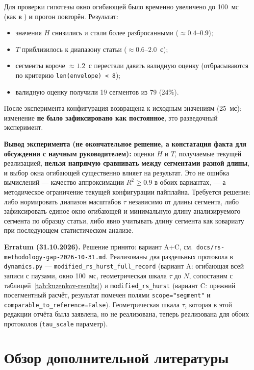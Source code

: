 \documentclass[12pt,a4paper]{article}
\begin{document}
Для проверки гипотезы окно огибающей было временно увеличено до 100~мс (как
в \cite{kuzenkov2014}) и прогон повторён. Результат:

\begin{itemize}
  \item значения $H$ снизились и стали более разбросанными ($\approx 0.4$--$0.9$);
  \item $T$ приблизилось к диапазону статьи ($\approx 0.6$--$2.0$~с);
  \item сегменты короче $\approx 1.2$~с перестали давать валидную оценку
   (отбрасываются по критерию \texttt{len(envelope) < 8});
  \item валидную оценку получили 19 сегментов из 79 (24\%).
\end{itemize}

После эксперимента конфигурация возвращена к исходным значениям (25~мс);
изменение \textbf{не было зафиксировано как постоянное}, это разведочный
эксперимент.

\textbf{Вывод эксперимента (не окончательное решение, а констатация факта
для обсуждения с научным руководителем):} оценки $H$ и $T$, получаемые
текущей реализацией, \textbf{нельзя напрямую сравнивать между сегментами
разной длины}, и выбор окна огибающей существенно влияет на результат. Это
не ошибка вычислений — качество аппроксимации $R^2 \geq 0.9$ в обоих
вариантах, — а методическое ограничение текущей конфигурации пайплайна.
Требуется решение: либо нормировать диапазон масштабов $\tau$ независимо от
длины сегмента, либо зафиксировать единое окно огибающей и минимальную
длину анализируемого сегмента по образцу статьи, либо явно учитывать длину
сегмента как ковариату при последующем статистическом анализе.

\textbf{Erratum (31.10.2026).} Решение принято: вариант A+C, см.\
\texttt{docs/rs-methodology-gap-2026-10-31.md}. Реализованы два раздельных
протокола в \texttt{dynamics.py} — \texttt{modified\_rs\_hurst\_full\_record}
(вариант A: огибающая всей записи с паузами, окно 100~мс, геометрическая
шкала $\tau$ до $N$, сопоставим с таблицей~\ref{tab:kuzenkov-results}) и
\texttt{modified\_rs\_hurst} (вариант C: прежний посегментный расчёт,
результат помечен полями \texttt{scope="segment"} и
\texttt{comparable\_to\_reference=False}). Геометрическая шкала $\tau$,
которая в этой редакции отчёта была заявлена, но не реализована, теперь
реализована для обоих протоколов (\texttt{tau\_scale} параметр).

\section{Обзор дополнительной литературы}
\end{document}
